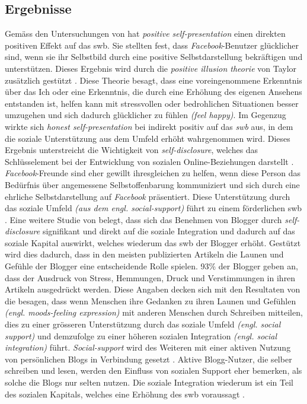 \subsection{Ergebnisse}\label{subsec.selfpErgebnisse}
Gemäss den Untersuchungen von  hat \textit{positive self-presentation} einen direkten positiven Effekt auf das \gls{swb}. Sie stellten fest, dass \textit{Facebook}-Benutzer glücklicher sind, wenn sie ihr Selbstbild durch eine positive Selbstdarstellung bekräftigen und unterstützen. Dieses Ergebnis wird durch die \textit{positive illusion theorie} von Taylor zusätzlich gestützt \cite{Taylor:1996,Taylor:1988}. Diese Theorie besagt, dass eine voreingenommene Erkenntnis über das Ich oder eine Erkenntnis, die durch eine Erhöhung des eigenen Ansehens entstanden ist, helfen kann mit stressvollen oder bedrohlichen Situationen besser umzugehen und sich dadurch glücklicher zu fühlen \textit{(feel happy)}. \newline
Im Gegenzug wirkte sich \textit{honest self-presentation} bei  indirekt positiv auf das \textit{\gls{swb}} aus, in dem die soziale Unterstützung aus dem Umfeld erhöht wahrgenommen wird. Dieses Ergebnis unterstreicht die Wichtigkeit von \textit{self-disclosure}, welches das Schlüsselement bei der Entwicklung von sozialen Online-Beziehungen darstellt \cite{Joinsen:2001}. \textit{Facebook}-Freunde sind eher gewillt ihresgleichen zu helfen, wenn diese Person das Bedürfnis über angemessene Selbstoffenbarung kommuniziert und sich durch eine ehrliche Selbstdarstellung auf \textit{Facebook} präsentiert. Diese Unterstützung durch das soziale Umfeld \textit{(aus dem engl. social-support)} führt zu einem förderlichen \gls{swb} \cite{Greene:2006}.\newline
Eine weitere Studie von  belegt, dass sich das Benehmen von Blogger durch \textit{self-disclosure} signifikant und direkt auf die soziale Integration und dadurch auf das soziale Kapital auswirkt, welches wiederum das \gls{swb} der Blogger erhöht. Gestützt wird dies dadurch, dass in den meisten publizierten Artikeln die Launen und Gefühle der Blogger eine entscheidende Rolle spielen. 93\% der Blogger geben an, dass der Ausdruck von Stress, Hemmungen, Druck und Verstimmungen in ihren Artikeln ausgedrückt werden. Diese Angaben decken sich mit den Resultaten von  die besagen, dass wenn Menschen ihre Gedanken zu ihren Launen und Gefühlen \textit{(engl. moods-feeling expression)} mit anderen Menschen durch Schreiben mitteilen, dies zu einer grösseren Unterstützung durch das soziale Umfeld \textit{(engl. social support)} und demzufolge zu einer höheren sozialen Integration \textit{(engl. social integration)} führt. \textit{Social-support} wird des Weiteren mit einer aktiven Nutzung von persönlichen Blogs in Verbindung gesetzt \cite{Jung:2012}. Aktive Blogg-Nutzer, die selber schreiben und lesen, werden den Einfluss von sozialen Support eher bemerken, als solche die Blogs nur selten nutzen. Die soziale Integration wiederum ist ein Teil des sozialen Kapitals, welches eine Erhöhung des \gls{swb} voraussagt \cite{Ko:2009}. \newline
